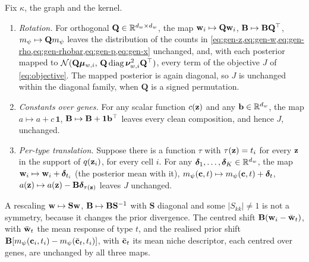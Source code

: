 \begin{proposition}\label{prop:S-symmetries}
Fix $\kappa$, the graph and the kernel.
\begin{enumerate}[label=(\alph*), leftmargin=*, nosep]
\item \emph{Rotation.} For orthogonal $\mathbf{Q} \in \mathbb{R}^{d_w \times d_w}$, the map $\mathbf{w}_i \mapsto \mathbf{Q}\mathbf{w}_i$, $\mathbf{B} \mapsto \mathbf{B}\mathbf{Q}^\top$, $m_{\psi} \mapsto \mathbf{Q}m_{\psi}$ leaves the distribution of the counts in \cref{eq:gen-z,eq:gen-w,eq:gen-rho,eq:gen-rhobar,eq:gen-p,eq:gen-x} unchanged, and, with each posterior mapped to $\mathcal{N}(\mathbf{Q}\boldsymbol{\mu}_{w,i},\, \mathbf{Q}\operatorname{diag}\boldsymbol{\nu}_{w,i}^2\mathbf{Q}^\top)$, every term of the objective $J$ of \cref{eq:objective}. The mapped posterior is again diagonal, so $J$ is unchanged within the diagonal family, when $\mathbf{Q}$ is a signed permutation.
\item \emph{Constants over genes.} For any scalar function $c(\mathbf{z})$ and any $\mathbf{b} \in \mathbb{R}^{d_w}$, the map $a \mapsto a + c\,\mathbf{1}$, $\mathbf{B} \mapsto \mathbf{B} + \mathbf{1}\mathbf{b}^\top$ leaves every clean composition, and hence $J$, unchanged.
\item \emph{Per-type translation.} Suppose there is a function $\tau$ with $\tau(\mathbf{z}) = t_i$ for every $\mathbf{z}$ in the support of $q(\mathbf{z}_i)$, for every cell $i$. For any $\boldsymbol{\delta}_1, \dots, \boldsymbol{\delta}_K \in \mathbb{R}^{d_w}$, the map $\mathbf{w}_i \mapsto \mathbf{w}_i + \boldsymbol{\delta}_{t_i}$ (the posterior mean with it), $m_{\psi}(\mathbf{c}, t) \mapsto m_{\psi}(\mathbf{c}, t) + \boldsymbol{\delta}_t$, $a(\mathbf{z}) \mapsto a(\mathbf{z}) - \mathbf{B}\boldsymbol{\delta}_{\tau(\mathbf{z})}$ leaves $J$ unchanged.
\end{enumerate}
A rescaling $\mathbf{w} \mapsto \mathbf{S}\mathbf{w}$, $\mathbf{B} \mapsto \mathbf{B}\mathbf{S}^{-1}$ with $\mathbf{S}$ diagonal and some $|S_{kk}| \neq 1$ is not a symmetry, because it changes the prior divergence.
The centred shift $\mathbf{B}(\mathbf{w}_i - \bar{\mathbf{w}}_t)$, with $\bar{\mathbf{w}}_t$ the mean response of type $t$, and the realised prior shift $\mathbf{B}[m_{\psi}(\mathbf{c}_i, t_i) - m_{\psi}(\bar{\mathbf{c}}_t, t_i)]$, with $\bar{\mathbf{c}}_t$ its mean niche descriptor, each centred over genes, are unchanged by all three maps.
\end{proposition}

